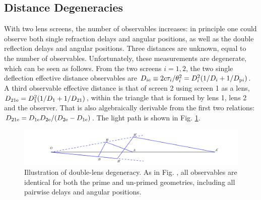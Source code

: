\documentclass[useAMS,usenatbib]{mn2e}
\begin{document}
\subsection{Distance Degeneracies}
\label{sec:degeneracy}
With two lens screens, the number of observables increases: in
principle one could observe both single refraction delays and angular
positions, as well as the double reflection delays and angular
positions.  Three distances are unknown, equal to the number of
observables.  Unfortunately, these measurements are degenerate, which
can be seen as follows. From the two screens $i=1,2$, the two single
deflection effective distance observables are
$D_{i{\rm e}} \equiv 2c\tau_i/\theta_i^2=D_i^2(1/D_i+1/D_{{\rm p}i})$.  A third
observable effective distance is that of screen 2 using screen 1 as a
lens, $D_{21{\rm e}}=D_1^2(1/D_1+1/D_{21})$, within the triangle that is formed by lens 1, lens 2 and the observer. That is also algebraically
derivable from the first two relations:
$D_{{21}{\rm e}}=D_{1{\rm e}}D_{2{\rm e}}/(D_{2{\rm e}}-D_{1{\rm e}})$. The light path is shown in Fig. \ref{fig:double_degeneracy}.
\begin{figure}
\centering
\hspace*{-1in}\includegraphics[width=9in]{double_degeneracy.pdf}
\caption{Illustration of double-lens degeneracy.  As in
  Fig. \protect{\ref{fig:Singledegeneracy}}, all observables are identical
  for both the prime and un-primed geometries, including all pairwise
  delays and angular positions.}
\label{fig:double_degeneracy}
\end{figure}
\end{document}
